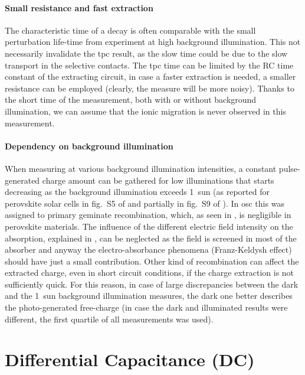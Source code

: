 	\paragraph{Small resistance and fast extraction}
	The characteristic time of a  decay is often comparable with the small perturbation life\hyp{}time from  experiment at high background illumination.
	This not necessarily invalidate the \gls{tpc} result, as the slow time could be due to the slow transport in the selective contacts.
	The \gls{tpc} time can be limited by the RC time constant of the extracting circuit, in case a faster extraction is needed, a smaller resistance can be employed (clearly, the measure will be more noisy).
	Thanks to the short time of the measurement, both with or without background illumination, we can assume that the ionic migration is never observed in this measurement.

	\paragraph{Dependency on background illumination}\label{tpc_intensity}
	When measuring  at various background illumination intensities, a constant pulse\hyp{}generated charge amount can be gathered for low illuminations that starts decreasing as the background illumination exceeds \SI{1}{sun} (as reported for perovskite solar cells in fig.~S5 of \cite{Du2018} and partially in fig.~S9 of \cite{Wheeler2017}).
	In \gls{osc} this was assigned to primary geminate recombination, which, as seen in , is negligible in perovskite materials.
	The influence of the different electric field intensity on the absorption, explained in , can be neglected as the field is screened in most of the absorber and anyway the electro\hyp{}absorbance phenomena (Franz\hyp{}Keldysh effect) should have just a small contribution.
	Other kind of recombination can affect the extracted charge, even in short circuit conditions, if the charge extraction is not sufficiently quick.
	For this reason, in case of large discrepancies between the dark and the \SI{1}{sun} background illumination measures, the dark one better describes the photo\hyp{}generated free\hyp{}charge (in case the dark and illuminated results were different, the first quartile of all  measurements was used).

	\FloatBarrier
	\newpage
\section{Differential Capacitance (DC)}


